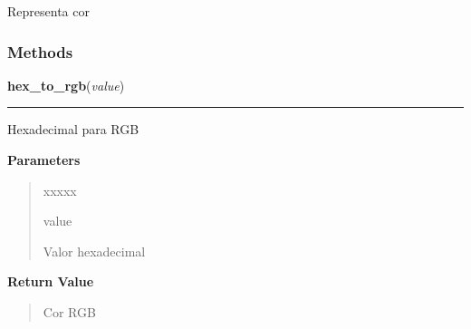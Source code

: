     \label{pygame-asteroids:color:Color}
Representa cor



  \subsubsection{Methods}

    \label{pygame-asteroids:color:Color:hex_to_rgb}

    \vspace{0.5ex}

\hspace{.8\funcindent}\begin{boxedminipage}{\funcwidth}

    \raggedright \textbf{hex\_to\_rgb}(\textit{value})

    \vspace{-1.5ex}

    \rule{\textwidth}{0.5\fboxrule}
\setlength{\parskip}{2ex}
    Hexadecimal para RGB

\setlength{\parskip}{1ex}
      \textbf{Parameters}
      \vspace{-1ex}

      \begin{quote}
        \begin{Ventry}{xxxxx}

          \item[value]

          Valor hexadecimal

        \end{Ventry}

      \end{quote}

      \textbf{Return Value}
    \vspace{-1ex}

      \begin{quote}
      Cor RGB

      \end{quote}

    \end{boxedminipage}

